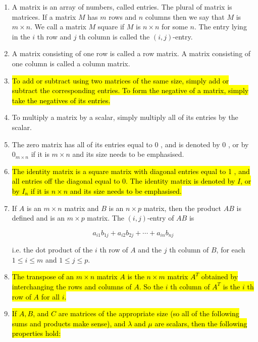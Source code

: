\documentclass[10pt]{article}
\begin{document}
\begin{enumerate}
\item A matrix is an array of numbers, called entries. The plural of matrix is matrices. If a matrix $M$ has $m$ rows and $n$ columns then we say that $M$ is $m \times n$. We call a matrix $M$ square if $M$ is $n \times n$ for some $n$. The entry lying in the $i$ th row and $j$ th column is called the $(i, j)$-entry.

\item A matrix consisting of one row is called a row matrix. A matrix consisting of one column is called a column matrix.

\item \hl{To add or subtract using two matrices of the same size, simply add or subtract the corresponding entries. To form the negative of a matrix, simply take the negatives of its entries.}

\item To multiply a matrix by a scalar, simply multiply all of its entries by the scalar.

\item The zero matrix has all of its entries equal to 0 , and is denoted by 0 , or by $0_{m \times n}$ if it is $m \times n$ and its size needs to be emphasised.

\item \hl{The identity matrix is a square matrix with diagonal entries equal to 1 , and all entries off the diagonal equal to 0. The identity matrix is denoted by $I$, or by $I_{n}$ if it is $n \times n$ and its size needs to be emphasised.}

\item If $A$ is an $m \times n$ matrix and $B$ is an $n \times p$ matrix, then the product $A B$ is defined and is an $m \times p$ matrix. The $(i, j)$-entry of $A B$ is

$$
a_{i 1} b_{1 j}+a_{i 2} b_{2 j}+\cdots+a_{i n} b_{n j}
$$

i.e. the dot product of the $i$ th row of $A$ and the $j$ th column of $B$, for each $1 \leq i \leq m$ and $1 \leq j \leq p$.

\item \hl{The transpose of an $m \times n$ matrix $A$ is the $n \times m$ matrix $A^{T}$ obtained by interchanging the rows and columns of $A$. So the $i$ th column of $A^{T}$ is the $i$ th row of $A$ for all $i$.}

\item \hl{If $A, B$, and $C$ are matrices of the appropriate size (so all of the following sums and products make sense), and $\lambda$ and $\mu$ are scalars, then the following properties hold:}


\end{enumerate}
\end{document}
